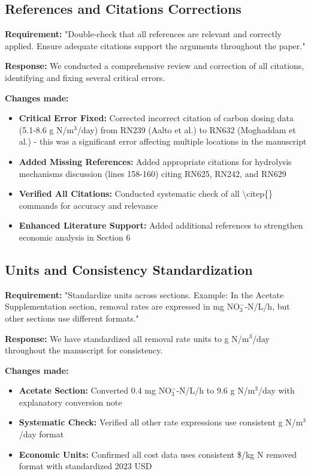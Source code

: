 \documentclass[12pt,a4paper]{article}
\begin{document}
\subsection{References and Citations Corrections}
\textbf{Requirement:} "Double-check that all references are relevant and correctly applied. Ensure adequate citations support the arguments throughout the paper."

\textbf{Response:} We conducted a comprehensive review and correction of all citations, identifying and fixing several critical errors.

\textbf{Changes made:}
\begin{itemize}
\item \textbf{Critical Error Fixed:} Corrected incorrect citation of carbon dosing data (5.1-8.6 g N/m$^3$/day) from RN239 (Aalto et al.) to RN632 (Moghaddam et al.) - this was a significant error affecting multiple locations in the manuscript
\item \textbf{Added Missing References:} Added appropriate citations for hydrolysis mechanisms discussion (lines 158-160) citing RN625, RN242, and RN629
\item \textbf{Verified All Citations:} Conducted systematic check of all \textbackslash citep\{\} commands for accuracy and relevance
\item \textbf{Enhanced Literature Support:} Added additional references to strengthen economic analysis in Section 6
\end{itemize}

\subsection{Units and Consistency Standardization}
\textbf{Requirement:} "Standardize units across sections. Example: In the Acetate Supplementation section, removal rates are expressed in mg NO$_3^-$-N/L/h, but other sections use different formats."

\textbf{Response:} We have standardized all removal rate units to g N/m$^3$/day throughout the manuscript for consistency.

\textbf{Changes made:}
\begin{itemize}
\item \textbf{Acetate Section:} Converted 0.4 mg NO$_3^-$-N/L/h to 9.6 g N/m$^3$/day with explanatory conversion note
\item \textbf{Systematic Check:} Verified all other rate expressions use consistent g N/m$^3$/day format
\item \textbf{Economic Units:} Confirmed all cost data uses consistent \$/kg N removed format with standardized 2023 USD
\end{itemize}
\end{document}
